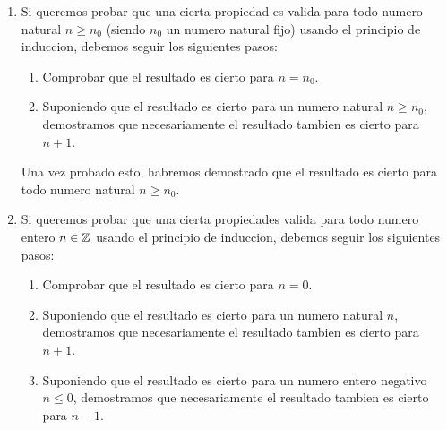 \begin{enumerate}
	\item Si queremos probar que una cierta propiedad es valida para todo numero natural \(n \geq  n_0\) (siendo \(n_0 \) un numero natural fijo) usando el principio de induccion, debemos seguir los siguientes pasos: \begin{enumerate}
		      \item Comprobar que el resultado es cierto para \(n = n_0 \).
		      \item Suponiendo que el resultado es cierto para un numero natural \(n \geq n_0 \), demostramos que necesariamente el resultado tambien es cierto para \(n + 1 \).
	      \end{enumerate}
	      Una vez probado esto, habremos demostrado que el resultado es cierto para todo numero natural \(n \geq  n_0 \).
	      
	\item Si queremos probar que una cierta propiedades valida para todo numero entero \(n \in  \mathbb{Z} \) usando el principio de induccion, debemos seguir los siguientes pasos:
	      \begin{enumerate}
		      \item Comprobar que el resultado es cierto para \(n = 0 \).
		      \item Suponiendo que el resultado es cierto para un numero natural \(n \), demostramos que necesariamente el resultado tambien es cierto para \(n + 1 \).
		      \item Suponiendo que el resultado es cierto para un numero entero negativo \(n \leq  0 \), demostramos que necesariamente el resultado tambien es cierto para \(n - 1\).
	      \end{enumerate}
	      
\end{enumerate}


